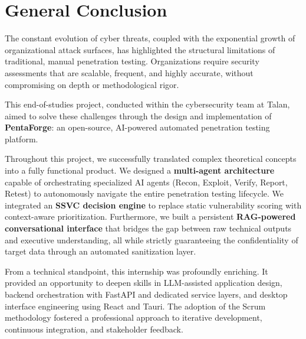 \documentclass[12pt,a4paper]{report}
\renewcommand{\footrulewidth}{0.4pt}
\renewcommand{\headrulewidth}{0pt}
\renewcommand{\headrulewidth}{0pt}
\renewcommand{\footrulewidth}{0.4pt}
\renewcommand{\headrulewidth}{0pt}
\renewcommand{\footrulewidth}{0.4pt}
\renewcommand{\headrulewidth}{0pt}
\renewcommand{\footrulewidth}{0.4pt}
\renewcommand{\headrulewidth}{0pt}
\renewcommand{\footrulewidth}{0.4pt}
\begin{document}
\pagestyle{fancy}
\fancyhf{}
\fancyfoot[R]{\thepage}
\renewcommand{\footrulewidth}{0.4pt}
\renewcommand{\headrulewidth}{0pt}
\newpage
\thispagestyle{fancy}
\chapter*{General Conclusion}

The constant evolution of cyber threats, coupled with the exponential growth of organizational 
attack surfaces, has highlighted the structural limitations of traditional, manual 
penetration testing. Organizations require security assessments that are scalable, 
frequent, and highly accurate, without compromising on depth or methodological rigor.

This end-of-studies project, conducted within the cybersecurity team at Talan, aimed to 
solve these challenges through the design and implementation of \textbf{PentaForge}: an 
open-source, AI-powered automated penetration testing platform. 

Throughout this project, we successfully translated complex theoretical concepts into a 
fully functional product. We designed a \textbf{multi-agent architecture} capable of 
orchestrating specialized AI agents (Recon, Exploit, Verify, Report, Retest) to autonomously 
navigate the entire penetration testing lifecycle. We integrated an \textbf{SSVC decision engine} 
to replace static vulnerability scoring with context-aware prioritization. Furthermore, 
we built a persistent \textbf{RAG-powered conversational interface} that bridges the gap 
between raw technical outputs and executive understanding, all while strictly guaranteeing 
the confidentiality of target data through an automated sanitization layer.

From a technical standpoint, this internship was profoundly enriching. It provided an
opportunity to deepen skills in LLM-assisted application design, backend
orchestration with FastAPI and dedicated service layers, and desktop interface
engineering using React and Tauri. The adoption of the Scrum methodology fostered a
professional approach to iterative development, continuous integration, and
stakeholder feedback.
\end{document}
